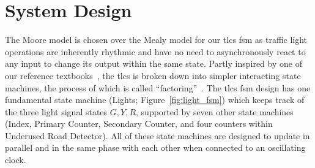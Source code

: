\section{System Design}
The Moore model \cite{book:harris} is chosen over the Mealy model \cite{book:harris} for our \ac{tlcs} \ac{fsm} as traffic light operations are inherently rhythmic and have no need to asynchronously react to any input to change its output within the same state. Partly inspired by one of our reference textbooks~\cite{book:harris}, the \ac{tlcs} is broken down into simpler interacting state machines, the process of which is called ``factoring''~\cite{book:harris}. The \ac{tlcs} \ac{fsm} design has one fundamental state machine (Lights; Figure~\ref{fig:light_fsm}) which keeps track of the three light signal states $G,Y,R$, supported by seven other state machines (Index, Primary Counter, Secondary Counter, and four counters within Underused Road Detector). All of these state machines are designed to update in parallel and in the same phase with each other when connected to an oscillating clock.
